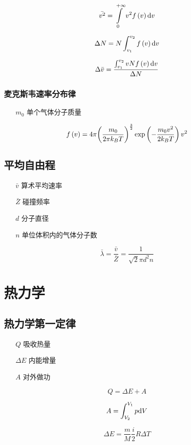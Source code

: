 \documentclass{article}
\begin{document}
\[\bar{v^2}=\int\limits_0^{+\infty}v^2f\left(v\right)\mathrm d v\]

\[\Delta N=N\int_{v_1}^{v_2}f\left(v\right)\mathrm d v\]

\[\Delta\bar v=\dfrac{\int_{v_1}^{v_2}vNf\left(v\right)\mathrm d v}{\Delta N}\]

\subsubsection{麦克斯韦速率分布律}

\begin{enumerate}
    \item[$m_0$] 单个气体分子质量
\end{enumerate}

\[f\left(v\right)=4\pi{\left(\frac{m_0}{2\pi k_BT}\right)}^{\frac32}\exp\left(-\frac{m_0v^2}{2k_BT}\right)v^2\]

\subsection{平均自由程}

\begin{enumerate}
    \item[$\bar v$] 算术平均速率
    \item[$\bar Z$] 碰撞频率
    \item[$d$] 分子直径
    \item[$n$] 单位体积内的气体分子数
\end{enumerate}

\[\bar\lambda=\frac{\bar v}{\bar Z}=\frac1{\sqrt2\pi d^2n}\]

\section{热力学}

\subsection{热力学第一定律}

\begin{enumerate}
    \item[$Q$] 吸收热量
    \item[$\Delta E$] 内能增量
    \item[$A$] 对外做功
\end{enumerate}

\[Q=\Delta E+A\]

\[A=\int_{V_2}^{V_1}p\mathrm d V\]

\[\Delta E=\frac mM\frac i2R\Delta T\]
\end{document}
